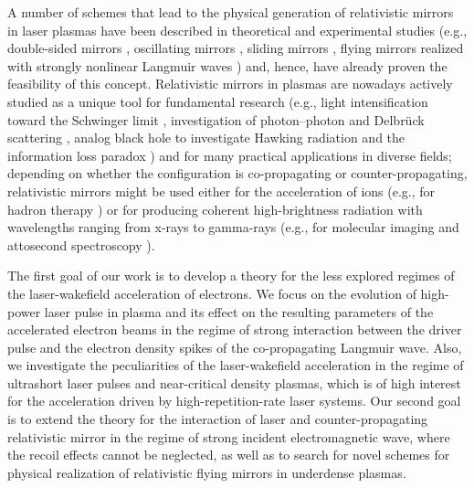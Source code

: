 \documentclass[10pt, a4paper, twoside, openright]{report}
\begin{document}
A number of schemes that lead to the physical generation of relativistic mirrors in laser plasmas have been described in theoretical and experimental studies (e.g., double-sided mirrors \cite{Kulagin2007a, Esirkepov2009, Wu2010, Kiefer2013, Ma2014}, oscillating mirrors \cite{Bulanov1994, Lichters1996, Naumova2004, Wheeler2012, Vincenti2019}, sliding mirrors \cite{Pirozhkov2006}, flying mirrors realized with strongly nonlinear Langmuir waves \cite{Bulanov2003, Kando2007, Pirozhkov2007, Kando2009}) and, hence, have already proven the feasibility of this concept. Relativistic mirrors in plasmas are nowadays actively studied as a unique tool for fundamental research (e.g., light intensification toward the Schwinger limit \cite{Bulanov2003}, investigation of photon–photon and Delbrück scattering \cite{Koga2012, Koga2018}, analog black hole to investigate Hawking radiation and the information loss paradox \cite{Chen2017, Chen2020}) and for many practical applications in diverse fields; depending on whether the configuration is co-propagating or counter-propagating, relativistic mirrors might be used either for the acceleration of ions (e.g., for hadron therapy \cite{Bulanov2002}) or for producing coherent high-brightness radiation with wavelengths ranging from x-rays to gamma-rays (e.g., for molecular imaging \cite{Neutze2000} and attosecond spectroscopy \cite{Krausz2009}).

The first goal of our work is to develop a theory for the less explored regimes of the laser-wakefield acceleration of electrons. We focus on the evolution of high-power laser pulse in plasma and its effect on the resulting parameters of the accelerated electron beams in the regime of strong interaction between the driver pulse and the electron density spikes of the co-propagating Langmuir wave. Also, we investigate the peculiarities of the laser-wakefield acceleration in the regime of ultrashort laser pulses and near-critical density plasmas, which is of high interest for the acceleration driven by high-repetition-rate laser systems. Our second goal is to extend the theory for the interaction of laser and counter-propagating relativistic mirror in the regime of strong incident electromagnetic wave, where the recoil effects cannot be neglected, as well as to search for novel schemes for physical realization of relativistic flying mirrors in underdense plasmas.
\end{document}
